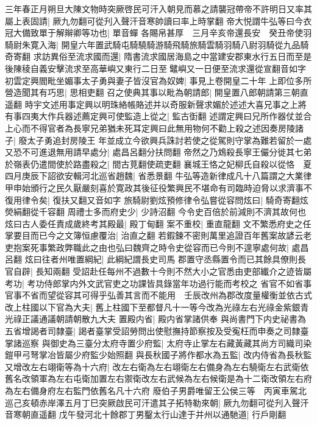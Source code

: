 三年春正月朔旦大陳文物時突厥啓民可汗入朝見而慕之請襲冠帶帝不許明日又率其屬上表固請|{
	厥九勿翻可從刋入聲汗音寒帥讀曰率上時掌翻}
帝大悦謂牛弘等曰今衣冠大備致單于解辮卿等功也|{
	單音蟬}
各賜帛甚厚　三月辛亥帝還長安　癸丑帝使羽騎尉朱寛入海|{
	開皇六年置武騎屯騎驍騎游騎飛騎旅騎雲騎羽騎八尉羽騎從九品騎奇寄翻}
求訪異俗至流求國而還|{
	隋書流求國居海島之中當建安郡東水行五日而至是後陳稜自義安擊流求至高華嶼又東行二日至鼊嶼又一日便至流求還從宣翻音如字}
初雲定興閻毗坐媚事太子勇與妻子皆沒官為奴婢|{
	事見上卷開皇二十年}
上即位多所營造聞其有巧思|{
	思相吏翻}
召之使典其事以毗為朝請郎|{
	開皇置八郎朝請第三朝直遥翻}
時宇文述用事定興以明珠絡帳賂述并以奇服新聲求媚於述述大喜兄事之上將有事四夷大作兵器述薦定興可使監造上從之|{
	監古衘翻}
述謂定興曰兄所作器仗並合上心而不得官者為長寧兄弟猶未死耳定興曰此無用物何不勸上殺之述因奏房陵諸子|{
	廢太子勇追封房陵王}
年並成立今欲興兵誅討若使之從駕則守掌為難若留於一處又恐不可進退無用請早處分|{
	處昌呂翻分扶問翻}
帝然之乃鴆殺長寧王儼分徙其七弟於嶺表仍遣間使於路盡殺之|{
	間古莧翻使疏吏翻}
襄城王恪之妃柳氏自殺以從恪　夏四月庚辰下詔欲安輯河北巡省趙魏|{
	省悉景翻}
牛弘等造新律成凡十八篇謂之大業律甲申始頒行之民久厭嚴刻喜於寛政其後征役繁興民不堪命有司臨時迫脅以求濟事不復用律令矣|{
	復扶又翻又音如字}
旅騎尉劉炫預修律令弘嘗從容問炫曰|{
	騎奇寄翻炫熒絹翻從千容翻}
周禮士多而府史少|{
	少詩沼翻}
今令史百倍於前減則不濟其故何也炫曰古人委任責成歲終考其殿最|{
	殿丁甸翻}
案不重校|{
	重直龍翻}
文不繁悉府史之任掌要目而已今之文簿恒慮覆治|{
	治直之翻}
若鍜鍊不密則萬里追證百年舊案故諺云老吏抱案死事繁政弊職此之由也弘曰魏齊之時令史從容而已今則不遑寧處何故|{
	處昌呂翻}
炫曰往者州唯置綱紀|{
	此綱紀謂長史司馬}
郡置守丞縣置令而已其餘具僚則長官自辟|{
	長知兩翻}
受詔赴任每州不過數十今則不然大小之官悉由吏部纎介之迹皆屬考功|{
	考功侍郎掌内外文武官吏之功課皆具錄當年功過行能而考校之}
省官不如省事官事不省而望從容其可得乎弘善其言而不能用　壬辰改州為郡改度量權衡並依古式改上柱國以下官為大夫|{
	舊上柱國下至都督凡十一等今改為光祿左右光祿金紫銀青光祿正議通議朝請朝散九大夫}
置殿内省|{
	殿内省掌諸供奉}
與尚書門下内史祕書為五省增謁者司隸臺|{
	謁者臺掌受詔勞問出使慰撫持節察按及受寃枉而申奏之司隸臺掌諸巡察}
與御史為三臺分太府寺置少府監|{
	太府寺止掌左右藏黃藏其尚方司織司染鎧甲弓弩掌冶皆屬少府監少始照翻}
與長秋國子將作都水為五監|{
	改内侍省為長秋監}
又增改左右翊衛等為十六府|{
	改左右衛為左右翊衛左右備身為左右驍衛左右武衛依舊名改領軍為左右屯衛加置左右禦衛改左右武候為左右候衛是為十二衛改領左右府為左右備身府左右監門依舊名凡十六府}
廢伯子男爵唯留王公侯三等　丙寅車駕北巡己亥頓赤岸澤五月丁巳突厥啟民可汗遣其子拓特勒來朝|{
	厥九勿翻可從刋入聲汗音寒朝直遥翻}
戊午發河北十餘郡丁男鑿太行山達于并州以通馳道|{
	行戶剛翻}
